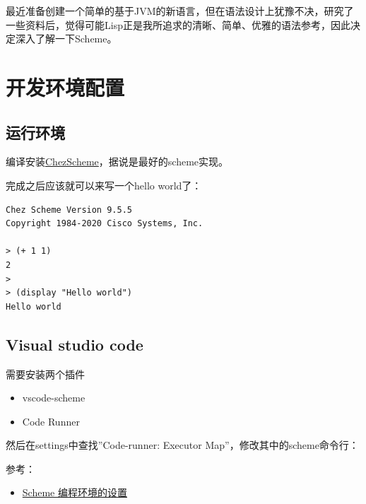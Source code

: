 \documentclass[12pt]{article}
\begin{document}
\makeblogtitle

最近准备创建一个简单的基于JVM的新语言，但在语法设计上犹豫不决，研究了一些资料后，觉得可能Lisp正是我所追求的清晰、简单、优雅的语法参考，因此决定深入了解一下Scheme。

\section{开发环境配置}\label{ux5f00ux53d1ux73afux5883ux914dux7f6e}

\subsection{运行环境}\label{ux8fd0ux884cux73afux5883}

编译安装\href{https://github.com/cisco/ChezScheme}{ChezScheme}，据说是最好的scheme实现。

\begin{Shaded}
\begin{Highlighting}[]
\end{Highlighting}
\end{Shaded}

完成之后应该就可以来写一个hello world了：

\begin{verbatim}
Chez Scheme Version 9.5.5
Copyright 1984-2020 Cisco Systems, Inc.

> (+ 1 1)
2
>
> (display "Hello world")
Hello world
\end{verbatim}

\subsection{Visual studio code}\label{visual-studio-code}

需要安装两个插件

\begin{itemize}
\tightlist
\item
  vscode-scheme
\item
  Code Runner
\end{itemize}

然后在settings中查找''Code-runner: Executor Map''，修改其中的scheme命令行：

\begin{Shaded}
\begin{Highlighting}[]
\ErrorTok{:} \FunctionTok{\{}
    \FunctionTok{:} 
\FunctionTok{\}}
\end{Highlighting}
\end{Shaded}

参考：

\begin{itemize}
\tightlist
\item
  \href{https://www.yinwang.org/blog-cn/2013/04/11/scheme-setup}{Scheme 编程环境的设置}
\end{itemize}
\end{document}
